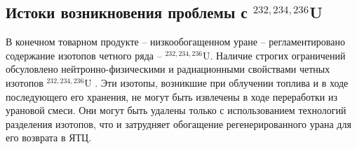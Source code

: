 


\subsection{Истоки возникновения проблемы с $^{232,234,236}$U}

В конечном товарном продукте -- низкообогащенном уране -- регламентировано содержание изотопов четного ряда -- $^{232,234,236}$U.
Наличие строгих ограничений обсуловлено нейтронно-физическими и радиационными свойствами четных изотопов $^{232,234,236}$U \cite{smirnovEvolutionIsotopicComposition2012, proselkovAnalizVozmozhnostiIspolzovaniya2003, dudnikovInfluence236UEfficacy2016}.
Эти изотопы, возникшие при облучении топлива и в ходе последующего его хранения, не могут быть извлечены в ходе переработки из урановой смеси. Они могут быть удалены только с использованием технологий разделения изотопов, что и затрудняет обогащение регенерированного урана для его возврата в ЯТЦ.

